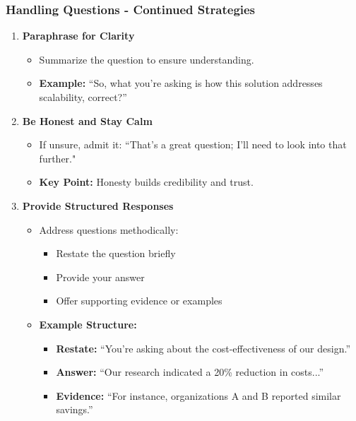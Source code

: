 \documentclass[aspectratio=169]{beamer}
\begin{document}
\begin{frame}[fragile]
    \frametitle{Handling Questions - Continued Strategies}
    \begin{enumerate}[resume]
        \item \textbf{Paraphrase for Clarity}
            \begin{itemize}
                \item Summarize the question to ensure understanding.
                \item \textbf{Example:} “So, what you’re asking is how this solution addresses scalability, correct?”
            \end{itemize}

        \item \textbf{Be Honest and Stay Calm}
            \begin{itemize}
                \item If unsure, admit it: “That’s a great question; I’ll need to look into that further."
                \item \textbf{Key Point:} Honesty builds credibility and trust.
            \end{itemize}

        \item \textbf{Provide Structured Responses}
            \begin{itemize}
                \item Address questions methodically:
                \begin{itemize}
                    \item Restate the question briefly
                    \item Provide your answer
                    \item Offer supporting evidence or examples
                \end{itemize}
                \item \textbf{Example Structure:}
                    \begin{itemize}
                        \item \textbf{Restate:} “You’re asking about the cost-effectiveness of our design.”
                        \item \textbf{Answer:} “Our research indicated a 20\% reduction in costs...”
                        \item \textbf{Evidence:} “For instance, organizations A and B reported similar savings.”
                    \end{itemize}
            \end{itemize}
    \end{enumerate}
\end{frame}
\end{document}

